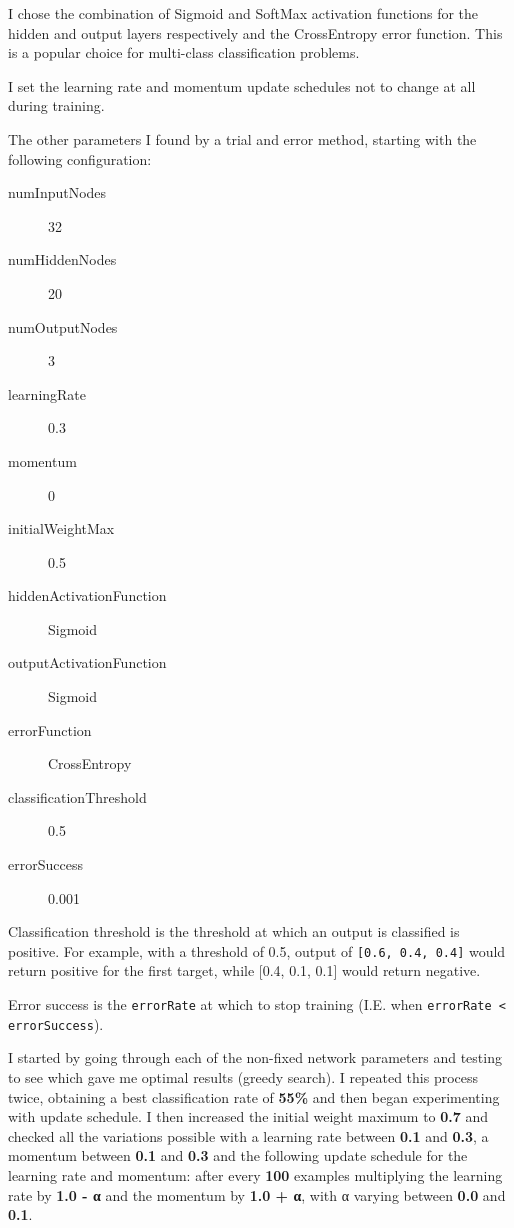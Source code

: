 \documentclass[a4paper]{article}
\begin{document}
I chose the combination of Sigmoid and SoftMax activation functions for the hidden and output layers respectively and the CrossEntropy error function. This is a popular choice for multi-class classification problems.

I set the learning rate and momentum update schedules not to change at all during training.

The other parameters I found by a trial and error method, starting with the following configuration:

\begin{description}
\item[numInputNodes] 32
\item[numHiddenNodes] 20
\item[numOutputNodes] 3
\item[learningRate] 0.3
\item[momentum] 0
\item[initialWeightMax] 0.5
\item[hiddenActivationFunction] Sigmoid
\item[outputActivationFunction] Sigmoid
\item[errorFunction] CrossEntropy
\item[classificationThreshold] 0.5
\item[errorSuccess] 0.001
\end{description}

Classification threshold is the threshold at which an output is classified is positive. For example, with a threshold of 0.5, output of \lstinline{[0.6, 0.4, 0.4]} would return positive for the first target, while [0.4, 0.1, 0.1] would return negative.

Error success is the \lstinline{errorRate} at which to stop training (I.E. when \lstinline{errorRate < errorSuccess}).

I started by going through each of the non-fixed network parameters and testing to see which gave me optimal results (greedy search). I repeated this process twice, obtaining a best classification rate of \textbf{55\%} and then began experimenting with update schedule. 
I then increased the initial weight maximum to \textbf{0.7} and checked all the variations possible with a learning rate between \textbf{0.1} and \textbf{0.3}, a momentum between \textbf{0.1} and \textbf{0.3} and the following update schedule for the learning rate and momentum: after every \textbf{100} examples multiplying the learning rate by \textbf{1.0 - α} and the momentum by \textbf{1.0 + α}, with α varying between \textbf{0.0} and \textbf{0.1}.
\end{document}
